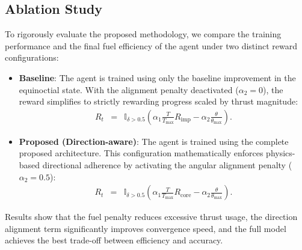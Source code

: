 \documentclass[paper]{ieice}
\begin{document}
\subsection{Ablation Study}

To rigorously evaluate the proposed methodology, we compare the training performance and the final fuel efficiency of the agent under two distinct reward configurations:

\begin{itemize}
\item \textbf{Baseline}: The agent is trained using only the baseline improvement in the equinoctial state. With the alignment penalty deactivated ($\alpha_2 = 0$), the reward simplifies to strictly rewarding progress scaled by thrust magnitude: 
\begin{eqnarray}
    R_t
    & = &
    \mathbb{I}_{\delta > 0.5} \left( \alpha_1 \frac{T}{T_{\max}} R_{\mathrm{imp}} - \alpha_2 \frac{\theta}{\theta_{\max}} \right).
\end{eqnarray}

\item \textbf{Proposed (Direction-aware)}: The agent is trained using the complete proposed architecture. This configuration mathematically enforces physics-based directional adherence by activating the angular alignment penalty ($\alpha_2 = 0.5$): 
\begin{eqnarray}
    R_t
    & = &
    \mathbb{I}_{\delta > 0.5} \left( \alpha_1 \frac{T}{T_{\max}} R_{\mathrm{core}} - \alpha_2 \frac{\theta}{\theta_{\max}} \right).
\end{eqnarray}
\end{itemize}

Results show that the fuel penalty reduces excessive thrust usage, the direction alignment term significantly improves convergence speed, and the full model achieves the best trade-off between efficiency and accuracy.


\end{document}

